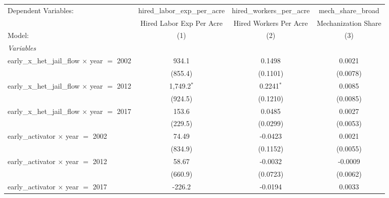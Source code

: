 
\begingroup
\centering
\begin{tabular}{lccc}
   \tabularnewline \midrule \midrule
   Dependent Variables:                                  & hired\_labor\_exp\_per\_acre     & hired\_workers\_per\_acre    & mech\_share\_broad\\    
                                                         & Hired Labor Exp Per Acre         & Hired Workers Per Acre       & Mechanization Share \\   
   Model:                                                & (1)                              & (2)                          & (3)\\  
   \midrule
   \emph{Variables}\\
   early\_x\_het\_jail\_flow $\times$ year $=$ 2002      & 934.1                            & 0.1498                       & 0.0021\\   
                                                         & (855.4)                          & (0.1101)                     & (0.0078)\\   
   early\_x\_het\_jail\_flow $\times$ year $=$ 2012      & 1,749.2$^{*}$                    & 0.2241$^{*}$                 & 0.0085\\   
                                                         & (924.5)                          & (0.1210)                     & (0.0085)\\   
   early\_x\_het\_jail\_flow $\times$ year $=$ 2017      & 153.6                            & 0.0485                       & 0.0027\\   
                                                         & (229.5)                          & (0.0299)                     & (0.0053)\\   
   early\_activator $\times$ year $=$ 2002               & 74.49                            & -0.0423                      & 0.0021\\   
                                                         & (834.9)                          & (0.1152)                     & (0.0055)\\   
   early\_activator $\times$ year $=$ 2012               & 58.67                            & -0.0032                      & -0.0009\\   
                                                         & (660.9)                          & (0.0723)                     & (0.0062)\\   
   early\_activator $\times$ year $=$ 2017               & -226.2                           & -0.0194                      & 0.0033\\   

\end{tabular}
